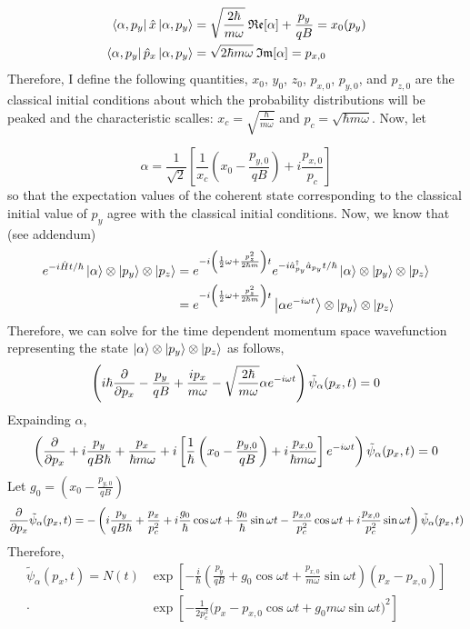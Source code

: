 \documentclass[12pt]{extarticle}
\begin{document}
\begin{enumerate}
\begin{align*}
\left< \alpha, p_y \right| \hat{x} \left| \alpha, p_y \right> &= \sqrt{\frac{2\hbar}{m \omega}} \: \mathfrak{Re}[\alpha] + \frac{p_y}{q B} = x_0(p_y) \\ 
\left< \alpha, p_y \right| \hat{p}_x \left| \alpha, p_y \right> &= \sqrt{{2 \hbar m \omega}} \: \mathfrak{Im}[\alpha] = p_{x,0}
\end{align*}
Therefore, I define the following quantities, $x_0$, $y_0$, $z_0$, $p_{x,0}$, $p_{y,0}$, and $p_{z,0}$ are the classical initial conditions about which the probability distributions will be peaked and the characteristic scalles: $x_c = \sqrt{\frac{\hbar}{m \omega}}$ and $p_c = \sqrt{\hbar m \omega}$. Now, let

\[\alpha = \frac{1}{\sqrt{2}} \left[ \frac{1}{x_c} \left(x_0 - \frac{p_{y,0}}{qB} \right) + i \frac{p_{x,0}}{p_c} \right] \]
so that the expectation values of the coherent state corresponding to the classical initial value of $p_y$ agree with the classical initial conditions. Now, we know that (see addendum)
\begin{align*} 
e^{-i \hat{H} t/\hbar} \left| \alpha \right> \otimes \left| p_y \right> \otimes \left| p_z \right> &= e^{-i \left(\frac{1}{2} \omega  + \frac{p_z^2}{2\hbar m} \right) t} e^{-i \hat{a}^\dagger_{p_y} \hat{a}_{p_y} t/ \hbar} \left| \alpha \right> \otimes \left| p_y \right> \otimes \left| p_z \right> \\ 
& = e^{-i \left(\frac{1}{2} \omega  + \frac{p_z^2}{2\hbar m} \right) t} \left| \alpha e^{-i \omega t} \right> \otimes \left| p_y \right> \otimes \left| p_z \right>
\end{align*}
Therefore, we can solve for the time dependent momentum space wavefunction representing the state $\left| \alpha \right> \otimes \left| p_y \right> \otimes \left| p_z \right>$ as follows, 
\[ \left( i \hbar \frac{\partial{}}{\partial{p_x}} - \frac{p_y}{q B} + \frac{i p_x}{m \omega} - \sqrt{\frac{2 \hbar}{m \omega}} \alpha e^{-i \omega t} \right) \tilde{\psi}_\alpha(p_x, t) = 0\]
Expainding $\alpha$, 
\[ \left( \frac{\partial{}}{\partial{p_x}} + i \frac{p_y}{q B \hbar} + \frac{p_x}{\hbar m \omega} + i \left[\frac{1}{\hbar} \left(x_0 - \frac{p_{y,0}}{q B} \right) + i \frac{p_{x,0}}{\hbar m \omega} \right] e^{-i \omega t} \right) \tilde{\psi}_\alpha(p_x, t) = 0 \]
Let $g_0 = \left(x_0 - \frac{p_{y,0}}{q B} \right)$
\begin{align*}
\frac{\partial{}}{\partial{p_x}} \tilde{\psi}_\alpha(p_x, t) = - \left( i \frac{p_y}{q B \hbar} + \frac{p_x}{p_c^2} + i \frac{g_0}{\hbar} \cos{\omega t} + \frac{g_0}{\hbar} \sin{\omega t} - \frac{p_{x,0}}{p_c^2} \cos{\omega t} + i \frac{p_{x,0}}{p_c^2} \sin{\omega t} \right)\tilde{\psi}_\alpha(p_x, t)
\end{align*}
Therefore, 
\begin{align*}
\tilde{\psi}_\alpha(p_x, t) = N(t) & \exp{\left[-\frac{i}{\hbar} \left(\frac{p_y}{qB} + g_0 \cos{\omega t} + \frac{p_{x, 0}}{m \omega} \sin{\omega t} \right) (p_x - p_{x,0}) \right]} \\ \cdot & \exp{\left[ -\frac{1}{2 p_c^2} \Big( p_x - p_{x,0} \cos{\omega t} + g_0 m \omega \sin{\omega t} \Big)^2 \right]}
\end{align*}
\end{enumerate}
\end{document}

